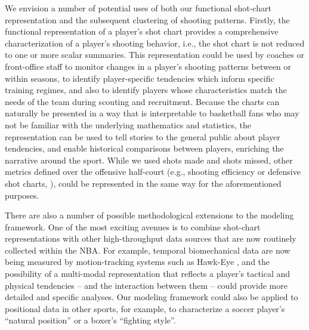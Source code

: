 We envision a number of potential uses of both our functional shot-chart representation and the subsequent clustering of shooting patterns.
Firstly, the functional representation of a player's shot chart provides a comprehensive characterization of a player's shooting behavior, i.e., the shot chart is not reduced to one or more scalar summaries.
This representation could be used by coaches or front-office staff to monitor changes in a player's shooting patterns between or within seasons, to identify player-specific tendencies which inform specific training regimes, and also to identify players whose characteristics match the needs of the team during scouting and recruitment.
Because the charts can naturally be presented in a way that is interpretable to basketball fans who may not be familiar with the underlying mathematics and statistics, the representation can be used to tell stories to the general public about player tendencies, and enable historical comparisons between players, enriching the narrative around the sport.
While we used shots made and shots missed, other metrics defined over the offensive half-court (e.g., shooting efficiency or defensive shot charts, \cite{franksCharacterizingSpatialStructure2015}), could be represented in the same way for the aforementioned purposes.

There are also a number of possible methodological extensions to the modeling framework.
One of the most exciting avenues is to combine shot-chart representations with other high-throughput data sources that are now routinely collected within the NBA.
For example, temporal biomechanical data are now being measured by motion-tracking systems such as Hawk-Eye \citep{HawkeyeInnovation2025}, and the possibility of a multi-modal representation that reflects a player's tactical and physical tendencies -- and the interaction between them -- could provide more detailed and specific analyses.
Our modeling framework could also be applied to positional data in other sports, for example, to characterize a soccer player's ``natural position'' or a boxer's ``fighting style''.

